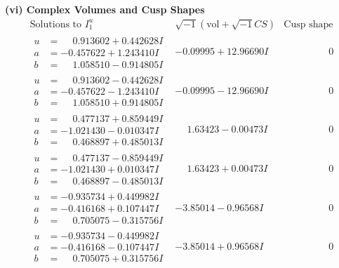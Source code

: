 \documentclass[1p]{elsarticle_modified}
\theoremstyle{definition}
\newcommand{\I}{\sqrt{-1}}
\begin{document}
\newpage\flushleft \textbf{(vi) Complex Volumes and Cusp Shapes}
$$\begin{array}{c|c|c}  
\text{Solutions to }I^u_{1}& \I (\text{vol} + \sqrt{-1}CS) & \text{Cusp shape}\\
 \hline 
\begin{aligned}
u &= \phantom{-}0.913602 + 0.442628 I \\
a &= -0.457622 + 1.243410 I \\
b &= \phantom{-}1.058510 - 0.914805 I\end{aligned}
 & -0.09995 + 12.96690 I & \phantom{-0.000000 } 0 \\ \hline\begin{aligned}
u &= \phantom{-}0.913602 - 0.442628 I \\
a &= -0.457622 - 1.243410 I \\
b &= \phantom{-}1.058510 + 0.914805 I\end{aligned}
 & -0.09995 - 12.96690 I & \phantom{-0.000000 } 0 \\ \hline\begin{aligned}
u &= \phantom{-}0.477137 + 0.859449 I \\
a &= -1.021430 - 0.010347 I \\
b &= \phantom{-}0.468897 + 0.485013 I\end{aligned}
 & \phantom{-}1.63423 - 0.00473 I & \phantom{-0.000000 } 0 \\ \hline\begin{aligned}
u &= \phantom{-}0.477137 - 0.859449 I \\
a &= -1.021430 + 0.010347 I \\
b &= \phantom{-}0.468897 - 0.485013 I\end{aligned}
 & \phantom{-}1.63423 + 0.00473 I & \phantom{-0.000000 } 0 \\ \hline\begin{aligned}
u &= -0.935734 + 0.449982 I \\
a &= -0.416168 + 0.107447 I \\
b &= \phantom{-}0.705075 - 0.315756 I\end{aligned}
 & -3.85014 - 0.96568 I & \phantom{-0.000000 } 0 \\ \hline\begin{aligned}
u &= -0.935734 - 0.449982 I \\
a &= -0.416168 - 0.107447 I \\
b &= \phantom{-}0.705075 + 0.315756 I\end{aligned}
 & -3.85014 + 0.96568 I & \phantom{-0.000000 } 0 \\ \hline\begin{aligned}

\end{aligned}
\end{array}$$
\end{document}
